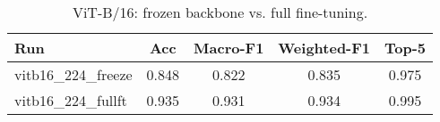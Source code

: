 \begin{table}[h]
  \centering
  \begin{tabular}{lcccc}
    \toprule
    Run & Acc & Macro-F1 & Weighted-F1 & Top-5 \\
    \midrule
    vitb16_224_freeze & 0.848 & 0.822 & 0.835 & 0.975 \\
    vitb16_224_fullft & 0.935 & 0.931 & 0.934 & 0.995 \\
    \bottomrule
  \end{tabular}
  \caption{ViT-B/16: frozen backbone vs. full fine-tuning.}
  \label{tab:ablation_vit_freeze}
\end{table}
